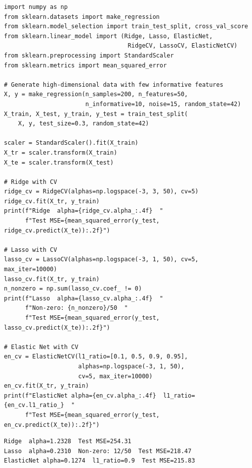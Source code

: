 \begin{codeblock}[title=\textbf{Ridge, Lasso, Elastic Net with scikit-learn}]
\begin{verbatim}
import numpy as np
from sklearn.datasets import make_regression
from sklearn.model_selection import train_test_split, cross_val_score
from sklearn.linear_model import (Ridge, Lasso, ElasticNet,
                                   RidgeCV, LassoCV, ElasticNetCV)
from sklearn.preprocessing import StandardScaler
from sklearn.metrics import mean_squared_error

# Generate high-dimensional data with few informative features
X, y = make_regression(n_samples=200, n_features=50,
                       n_informative=10, noise=15, random_state=42)
X_train, X_test, y_train, y_test = train_test_split(
    X, y, test_size=0.3, random_state=42)

scaler = StandardScaler().fit(X_train)
X_tr = scaler.transform(X_train)
X_te = scaler.transform(X_test)

# Ridge with CV
ridge_cv = RidgeCV(alphas=np.logspace(-3, 3, 50), cv=5)
ridge_cv.fit(X_tr, y_train)
print(f"Ridge  alpha={ridge_cv.alpha_:.4f}  "
      f"Test MSE={mean_squared_error(y_test, ridge_cv.predict(X_te)):.2f}")

# Lasso with CV
lasso_cv = LassoCV(alphas=np.logspace(-3, 1, 50), cv=5, max_iter=10000)
lasso_cv.fit(X_tr, y_train)
n_nonzero = np.sum(lasso_cv.coef_ != 0)
print(f"Lasso  alpha={lasso_cv.alpha_:.4f}  "
      f"Non-zero: {n_nonzero}/50  "
      f"Test MSE={mean_squared_error(y_test, lasso_cv.predict(X_te)):.2f}")

# Elastic Net with CV
en_cv = ElasticNetCV(l1_ratio=[0.1, 0.5, 0.9, 0.95],
                     alphas=np.logspace(-3, 1, 50),
                     cv=5, max_iter=10000)
en_cv.fit(X_tr, y_train)
print(f"ElasticNet alpha={en_cv.alpha_:.4f}  l1_ratio={en_cv.l1_ratio_}  "
      f"Test MSE={mean_squared_error(y_test, en_cv.predict(X_te)):.2f}")
\end{verbatim}
\end{codeblock}

\begin{codeoutput}
\begin{verbatim}
Ridge  alpha=1.2328  Test MSE=254.31
Lasso  alpha=0.2310  Non-zero: 12/50  Test MSE=218.47
ElasticNet alpha=0.1274  l1_ratio=0.9  Test MSE=215.83
\end{verbatim}
\end{codeoutput}

